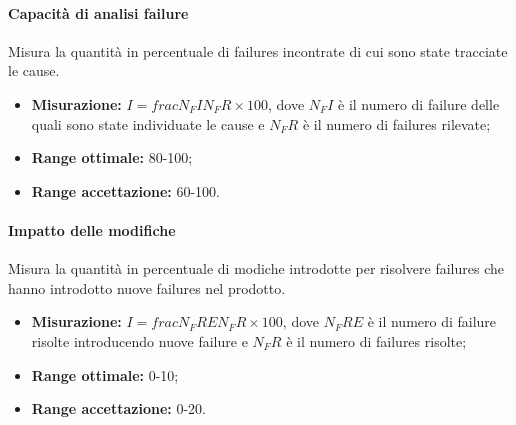 			\paragraph{Capacità di analisi failure} \Spazio
			Misura la quantità in percentuale di failures incontrate di cui sono state tracciate le cause.
			\begin{itemize}
				\item {\textbf{Misurazione:} $I=frac{N_FI}{N_FR}\times 100 $, dove $N_FI$ è il numero di failure delle quali sono state individuate le cause e $N_FR$ è il numero di failures rilevate};
				\item {\textbf{Range ottimale:} 80-100;}
				\item {\textbf{Range accettazione:} 60-100.}
			\end{itemize} 
			\paragraph{Impatto delle modifiche} \Spazio
			Misura la quantità in percentuale di modiche introdotte per risolvere failures che hanno introdotto nuove failures nel prodotto.
			\begin{itemize}
				\item {\textbf{Misurazione:} $I=frac{N_FRE}{N_FR}\times 100 $, dove $N_FRE$ è il numero di failure risolte introducendo nuove failure e $N_FR$ è il numero di failures risolte};
				\item {\textbf{Range ottimale:} 0-10;}
				\item {\textbf{Range accettazione:} 0-20.}
			\end{itemize} 
